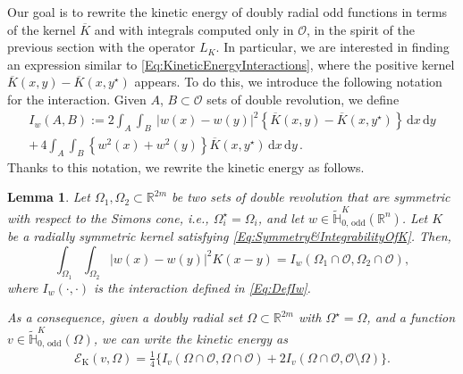 \documentclass[12pt,reqno]{amsart}
\newtheorem{lemma}[theorem]{Lemma}
\theoremstyle{definition}
\theoremstyle{remark}
\newcommand{\con}[1]{\mathbb{#1}}
\newcommand{\R}{\con{R}} %
\renewcommand{\H}{\con{H}}
\newcommand{\ecal}{\mathcal{E}}
\newcommand{\ocal}{\mathcal{O}}
\renewcommand{\d}{\,\mathrm{d}} %
\numberwithin{equation}{section}
\begin{document}
Our goal is to rewrite the kinetic energy of doubly radial odd functions in terms of the kernel $\overline{K}$ and with integrals computed only in $\ocal$, in the spirit of the previous section with the operator $L_K$. In particular, we are interested in finding an expression similar to \eqref{Eq:KineticEnergyInteractions}, where the positive kernel $\overline{K}(x,y) - \overline{K}(x,y^\star)$ appears. To do this, we introduce the following notation for the interaction. Given $A$, $B\subset \ocal$ sets of double revolution, we define
\begin{equation}
\label{Eq:DefIw}
\begin{split}
I_w(A,B) := 2\int_A  \int_B  \ |w(x)-w(y)|^2 \left\{ \overline{K}(x,y) - \overline{K}(x,y^\star) \right\} \d x \d y  \\
+\, 4 \int_A  \int_B  \left\{w^2(x)+w^2(y)\right\} \overline{K}(x,y^\star) \d x \d y\,.
\end{split}
\end{equation}
Thanks to this notation, we rewrite the kinetic energy as follows.


\begin{lemma}
	\label{Lemma:ShortExpressionEnergy}
	Let $\Omega_1, \Omega_2 \subset \R^{2m}$ be two sets of double revolution that are symmetric with respect to the Simons cone, i.e., $\Omega_i^\star = \Omega_i$, and let $w\in \widetilde{\H}^K_{0,\, \mathrm{odd}}(\R^n)$. Let $K$ be a radially symmetric kernel satisfying \eqref{Eq:Symmetry&IntegrabilityOfK}. Then, 
	\begin{equation}
	\label{Eq:InteractionsEquality}
	\int_{\Omega_1} \int_{\Omega_2} |w(x)-w(y)|^2 K(x-y) = I_w(\Omega_1\cap \ocal, \Omega_2\cap \ocal),
	\end{equation}
	where $I_w(\cdot, \cdot)$ is the interaction defined in \eqref{Eq:DefIw}.
	
	As a consequence, given a doubly radial set $\Omega\subset \R^{2m}$ with $\Omega^\star = \Omega$, and a function $v\in \widetilde{\H}^K_{0,\, \mathrm{odd}}(\Omega)$, we can write the kinetic energy as
	\begin{align}
	\label{Eq:ShortExpressionEnergy}
	\ecal_\mathrm{K}(v, \Omega) = \frac{1}{4} \big \{I_v(\Omega\cap\ocal,\Omega\cap\ocal) +  2I_v(\Omega\cap\ocal,\ocal\setminus\Omega) \big \}.
	\end{align}
	
\end{lemma}
\end{document}
